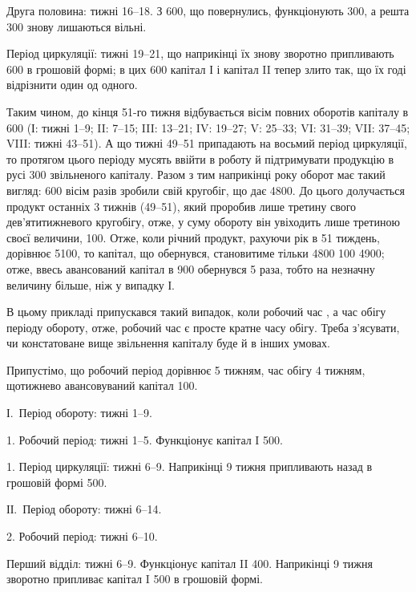 Друга половина: тижні 16--18. З 600, що повернулись,
функціонують 300, а решта 300 знову лишаються
вільні.

Період циркуляції: тижні 19--21, що наприкінці їх знову зворотно
припливають 600 в грошовій формі; в цих 600
капітал І і капітал II тепер злито так, що їх годі відрізнити один од одного.

Таким чином, до кінця 51-го тижня відбувається вісім повних оборотів
капіталу в 600 (І: тижні 1--9; II: 7--15; III: 13--21;
IV: 19--27; V: 25--33; VI: 31--39; VII: 37--45; VIII: тижні
43--51). А що тижні 49--51 припадають на восьмий період циркуляції,
то протягом цього періоду мусять ввійти в роботу й підтримувати
продукцію в русі 300 звільненого капіталу. Разом з тим наприкінці
року оборот має такий вигляд: 600 вісім разів зробили
свій кругобіг, що дає 4800. До цього долучається продукт
останніх 3 тижнів (49--51), який проробив лише третину свого дев’ятитижневого
кругобігу, отже, у суму обороту він увіходить лише третиною
своєї величини, 100. Отже, коли річний продукт, рахуючи рік в
51 тиждень, дорівнює 5100, то капітал, що обернувся, становитиме
тільки 4800 \dplus{} 100 \deq{} 4900; отже, ввесь авансований капітал
в 900 обернувся 5 раза, тобто на незначну величину більше,
ніж у випадку І.

В цьому прикладі припускався такий випадок, коли робочий час \deq{} ,
а час обігу \deq{}  періоду обороту, отже, робочий час є просте кратне
часу обігу. Треба з’ясувати, чи констатоване вище звільнення капіталу
буде й в інших умовах.

Припустімо, що робочий період дорівнює 5 тижням, час обігу \deq{} 4 тижням,
щотижнево авансовуваний капітал \deq{} 100.

І.~Період обороту: тижні 1--9.

1. Робочий період: тижні 1--5. Функціонує капітал I \deq{} 500.

1. Період циркуляції: тижні 6--9. Наприкінці 9 тижня припливають
назад в грошовій формі 500.

ІІ.~Період обороту: тижні 6--14.

2. Робочий період: тижні 6--10.

Перший відділ: тижні 6--9. Функціонує капітал II \deq{} 400.
Наприкінці 9 тижня зворотно припливає капітал I \deq{} 500 в грошовій
формі.

